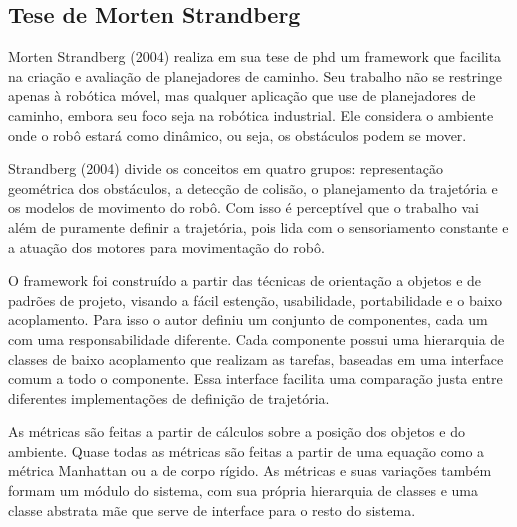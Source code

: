 \subsection{Tese de Morten Strandberg}

Morten Strandberg (2004) realiza em sua tese de phd um framework que facilita na criação e avaliação de planejadores de caminho. Seu trabalho não se restringe apenas à robótica móvel, mas qualquer aplicação que use de planejadores de caminho, embora seu foco seja na robótica industrial. Ele considera o ambiente onde o robô estará como dinâmico, ou seja, os obstáculos podem se mover.

Strandberg (2004) divide os conceitos em quatro grupos: representação geométrica dos obstáculos, a detecção de colisão, o planejamento da trajetória e os modelos de movimento do robô. Com isso é perceptível que o trabalho vai além de puramente definir a trajetória, pois lida com o sensoriamento constante e a atuação dos motores para movimentação do robô.

O framework foi construído a partir das técnicas de orientação a objetos e de padrões de projeto, visando a fácil estenção, usabilidade, portabilidade e o baixo acoplamento. Para isso o autor definiu um conjunto de componentes, cada um com uma responsabilidade diferente. Cada componente possui uma hierarquia de classes de baixo acoplamento que realizam as tarefas, baseadas em uma interface comum a todo o componente. Essa interface facilita uma comparação justa entre diferentes implementações de definição de trajetória.

As métricas são feitas a partir de cálculos sobre a posição dos objetos e do ambiente. Quase todas as métricas são feitas a partir de uma equação como a métrica Manhattan ou a de corpo rígido. As métricas e suas variações também formam um módulo do sistema, com sua própria hierarquia de classes e uma classe abstrata mãe que serve de interface para o resto do sistema.